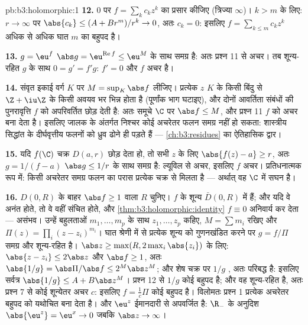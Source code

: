 \begin{solution}{pb:b3:holomorphic:1}
\textbf{12.} $0$ पर $f = \sum_kc_kz^k$ का प्रसार कीजिए (त्रिज्या $\infty$)। $k > m$
के लिए: $r \to \infty$ पर $\abs{c_k} \leq (A + Br^m)/r^k \to
0$, अतः $c_k = 0$: इसलिए $f =
\sum_{k\leq m}c_kz^k$ अधिक से अधिक घात $m$
का बहुपद है।

\textbf{13.} $g = \eu^f$ $\abs g =
\eu^{\operatorname{Re}f} \leq \eu^M$ के साथ समग्र है: अतः प्रश्न 11 से अचर। तब
शून्य-रहित $g$ के साथ $0 = g' = f'g$: $f' = 0$ और $f$ अचर है।

\textbf{14.}  संवृत इकाई वर्ग $K$ पर $M = \sup_K\abs f$ लीजिए। प्रत्येक
$z$ $K$ के किसी बिंदु से $\Z + \iu\Z$ के किसी अवयव भर भिन्न होता है
(पूर्णांक भाग घटाइए), और दोनों आवर्तिता संबंधों की पुनरावृत्ति $f$
को अपरिवर्तित छोड़ देती है: अतः समूचे $\C$ पर $\abs f \leq M$, और प्रश्न 11
$f$ को अचर बना देता है। इसलिए जालक के अंतर्गत निश्चर कोई अचरेतर
फलन समग्र नहीं हो सकता: शास्त्रीय सिद्धांत के दीर्घवृत्तीय फलनों को
ध्रुव ढोने ही पड़ते हैं --- \cref{ch:b3:residues} का ऐतिहासिक द्वार।

\textbf{15.} यदि $f(\C)$ चक्र $D(a, r)$ छोड़ देता हो, तो सभी $z$ के लिए
$\abs{f(z) - a} \geq r$, अतः $g = 1/(f - a)$ $\abs g \leq 1/r$ के साथ समग्र है: ल्यूविल से अचर, इसलिए $f$
अचर। प्रतिधनात्मक रूप में: किसी अचरेतर समग्र फलन का परास प्रत्येक
चक्र से मिलता है --- अर्थात् वह $\C$ में सघन है।

\textbf{16.} $D(0, R)$ के बाहर $\abs f \geq 1$ वाला $R$ चुनिए। $f$ के शून्य
 $\bar D(0, R)$ में हैं; और यदि वे अनंत होते, तो वे वहीं संचित होते, और
\cref{thm:b3:holomorphic:identity} $f
\equiv 0$ अनिवार्य कर देता --- असंभव। उन्हें बहुलताओं $m_1, \dots, m_p$ के साथ
$z_1, \dots, z_p$ कहिए, $M = \sum m_i$ रखिए और $\Pi(z) = \prod_i(z - z_i)^{m_i}$। घात श्रेणी में से प्रत्येक शून्य को
गुणनखंडित करने पर $g = f/\Pi$ समग्र और शून्य-रहित है। $\abs z \geq \max(R, 2\max_i\abs{z_i})$ के लिए: $\abs{z - z_i}
\leq 2\abs z$
और $\abs f \geq 1$, अतः $\abs{1/g} =
\abs\Pi/\abs f \leq 2^M\abs z^M$; और शेष  चक्र पर $1/g$ , अतः परिबद्ध है:
इसलिए सर्वत्र $\abs{1/g} \leq A +
B\abs z^M$। प्रश्न 12 से $1/g$ कोई बहुपद है; और वह शून्य-रहित
है, अतः प्रश्न 7 से कोई शून्येतर अचर $c$: इसलिए $f = \frac1c\Pi$ कोई बहुपद
है। विलोमतः प्रश्न 1 प्रत्येक अचरेतर बहुपद को यथोचित बना देता है।
और $\eu^z$ ईमानदारी से अपवर्जित है: $\R_-$ के अनुदिश $\abs{\eu^z} = \eu^x \to 0$ जबकि $\abs z \to \infty$।


\end{solution}
